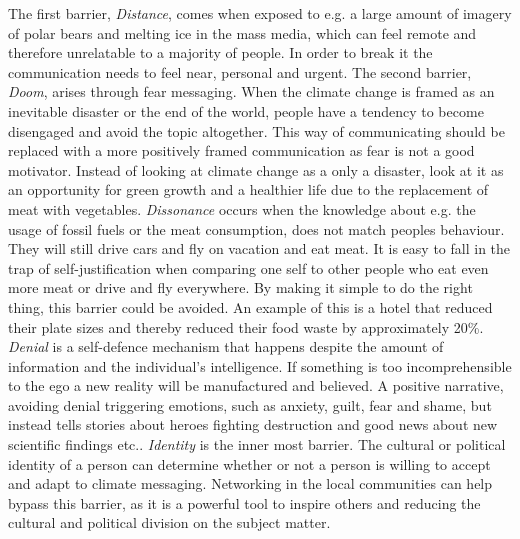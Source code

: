         The first barrier, \textit{Distance}, comes when exposed to e.g. a large amount of imagery of polar bears and melting ice in the mass media, which can feel remote and therefore unrelatable to a majority of people\citep[p.~108]{storyAboutClimateChange}. In order to break it the communication needs to feel near, personal and urgent\cite{the5Ds}.
        The second barrier, \textit{Doom}, arises through fear messaging. When the climate change is framed as an inevitable disaster or the end of the world, people have a tendency to become disengaged and avoid the topic altogether\citep[p.~109]{storyAboutClimateChange}. This way of communicating should be replaced with a more positively framed communication as fear is not a good motivator. Instead of looking at climate change as a only a disaster, look at it as an opportunity for green growth and a healthier life due to the replacement of meat with vegetables\cite{the5Ds}.
        \textit{Dissonance} occurs when the knowledge about e.g. the usage of fossil fuels or the meat consumption, does not match peoples behaviour. They will still drive cars and fly on vacation and eat meat. It is easy to fall in the trap of self-justification when comparing one self to other people who eat even more meat or drive and fly everywhere\citep[p.~109]{storyAboutClimateChange}. By making it simple to do the right thing, this barrier could be avoided. An example of this is a hotel that reduced their plate sizes and thereby reduced their food waste by approximately 20\%\cite{the5Ds}.
        \textit{Denial} is a self-defence mechanism that happens despite the amount of information and the individual's intelligence\citep[p.~109]{storyAboutClimateChange}. If something is too incomprehensible to the ego a new reality will be manufactured and believed. A positive narrative, avoiding denial triggering emotions, such as anxiety, guilt, fear and shame, but instead tells stories about heroes fighting destruction and good news about new scientific findings etc.\cite{the5Ds}.
        \textit{Identity} is the inner most barrier. The cultural or political identity of a person can determine whether or not a person is willing to accept and adapt to climate messaging\citep[p.~109]{storyAboutClimateChange}. Networking in the local communities can help bypass this barrier, as it is a powerful tool to inspire others and reducing the cultural and political division on the subject matter\citep[p.~133]{storyAboutClimateChange}\cite{the5Ds}.
        
